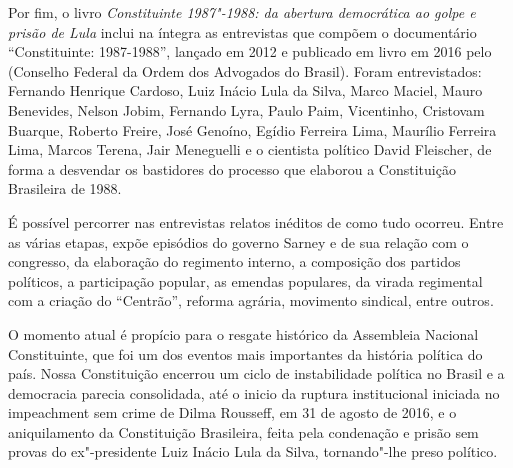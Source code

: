 Por fim, o livro \emph{Constituinte 1987"-1988: da abertura democrática
ao golpe e prisão de Lula} inclui na íntegra as entrevistas
que compõem o documentário “Constituinte: 1987-1988”, lançado em 2012 e
publicado em livro em 2016 pelo  (Conselho Federal da Ordem dos Advogados do
Brasil). Foram entrevistados: Fernando Henrique Cardoso, Luiz Inácio Lula da Silva, Marco
Maciel, Mauro Benevides, Nelson Jobim, Fernando Lyra, Paulo Paim, Vicentinho, Cristovam Buarque,
Roberto Freire, José Genoíno, Egídio Ferreira Lima, Maurílio Ferreira Lima, Marcos Terena, Jair
Meneguelli e o cientista político David Fleischer, de forma a desvendar os bastidores do
processo que elaborou a Constituição Brasileira de 1988.

É possível percorrer nas entrevistas relatos inéditos de como tudo ocorreu. Entre as várias
etapas, expõe episódios do governo Sarney e de sua relação com o congresso, da elaboração do
regimento interno, a composição dos partidos políticos, a participação popular, as emendas
populares, da virada regimental com a criação do “Centrão”, reforma agrária, movimento sindical,
entre outros.

O momento atual é propício para o resgate histórico da Assembleia Nacional Constituinte, que
foi um dos eventos mais importantes da história política do país. Nossa Constituição encerrou
um ciclo de instabilidade política no Brasil e a democracia parecia consolidada, até o inicio da
ruptura institucional iniciada no impeachment sem crime de Dilma Rousseff, em 31 de agosto de
2016, e o aniquilamento da Constituição Brasileira, feita pela condenação e prisão sem provas
do ex"-presidente Luiz Inácio Lula da Silva, tornando"-lhe preso político.